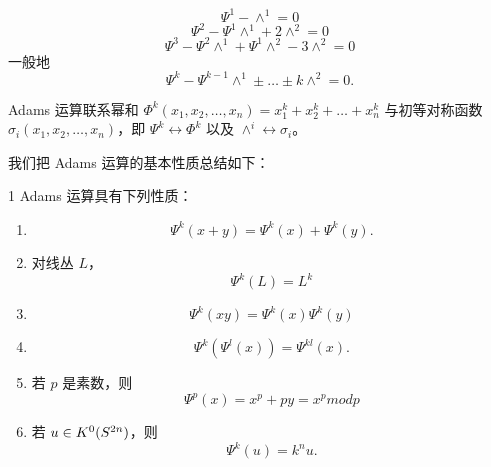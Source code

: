 \[ \Psi^1-\wedge^1 = 0 \]
\[ \Psi^2-\Psi^1\wedge^1+2\wedge^2 = 0 \]
\[ \Psi^3-\Psi^2\wedge^1+\Psi^1\wedge^2-3\wedge^2 = 0 \]
一般地
\[ \Psi^k-\Psi^{k-1}\wedge^1\pm\ldots\pm k\wedge^2 = 0. \]

Adams 运算联系幂和 $\Phi^k(x_1,x_2,\ldots,x_n) = x_1^k+x_2^k+\ldots+x_n^k$ 与初等对称函数 $\sigma_i(x_1,x_2,\ldots,x_n)$，即 $\Psi^k\leftrightarrow\Phi^k$ 以及 $\wedge^i\leftrightarrow\sigma_i$。

我们把 Adams 运算的基本性质总结如下：

\begin{prop}{1}
Adams 运算具有下列性质：
\begin{enumerate}[label=\arabic*.]
\item \[ \Psi^k(x+y) = \Psi^k(x)+\Psi^k(y). \]
\item 对线丛 $L$，
\[ \Psi^k(L) = L^k \]
\item \[ \Psi^k(xy) = \Psi^k(x)\Psi^k(y) \]
\item \[ \Psi^k(\Psi^l(x)) = \Psi^{kl}(x). \]
\item 若 $p$ 是素数，则
\[ \Psi^p(x) = x^p+py = x^p modp \]
\item 若 $u\in K^0(S^{2n})$，则
\[ \Psi^k(u) = k^n u. \]
\end{enumerate}
\end{prop}

